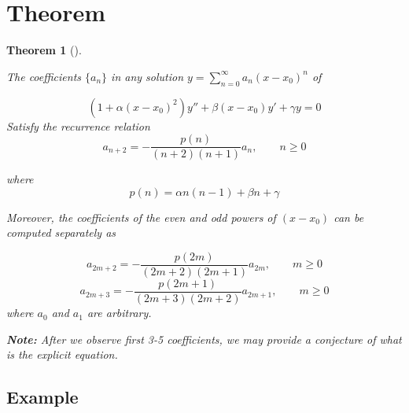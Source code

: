 \documentclass[
  letterpaper,
  DIV=11,
  numbers=noendperiod]{scrreprt}
\theoremstyle{plain}
\newtheorem{theorem}{Theorem}[chapter]
\theoremstyle{remark}
\begin{document}
\section{Theorem}\label{theorem-5}

\begin{tcolorbox}[enhanced jigsaw, title=\textcolor{quarto-callout-note-color}{\faInfo}\hspace{0.5em}{Note}, colbacktitle=quarto-callout-note-color!10!white, opacitybacktitle=0.6, opacityback=0, rightrule=.15mm, breakable, titlerule=0mm, colback=white, bottomtitle=1mm, colframe=quarto-callout-note-color-frame, toprule=.15mm, leftrule=.75mm, toptitle=1mm, arc=.35mm, bottomrule=.15mm, left=2mm, coltitle=black]

\begin{theorem}[]\protect\hypertarget{thm-rec-rel}{}\label{thm-rec-rel}

The coefficients \(\{a_n\}\) in any solution
\(y=\sum_{n=0}^\infty a_n(x-x_0)^n\) of

\[(1+\alpha(x-x_0)^2)y''+\beta(x-x_0)y'+\gamma y=0\] Satisfy the
recurrence relation
\[a_{n+2}=-\frac{p(n)}{(n+2)(n+1)}a_n,\qquad n\geq 0\]

where \[p(n)=\alpha n(n-1)+\beta n +\gamma\]

Moreover, the coefficients of the even and odd powers of \((x-x_0)\) can
be computed separately as

\[a_{2m+2}=-\frac{p(2m)}{(2m+2)(2m+1)}a_{2m},\qquad m\geq 0\]
\[a_{2m+3}=-\frac{p(2m+1)}{(2m+3)(2m+2)}a_{2m+1},\qquad m\geq 0\] where
\(a_0\) and \(a_1\) are arbitrary.

\textbf{Note:} After we observe first 3-5 coefficients, we may provide a
conjecture of what is the explicit equation.

\end{theorem}

\end{tcolorbox}

\subsection{Example}\label{example-10}
\end{document}
